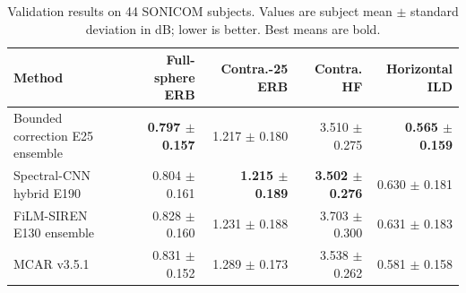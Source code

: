 \begin{table}[t]
\centering
\caption{Validation results on 44 SONICOM subjects. Values are subject mean $\pm$ standard deviation in dB; lower is better. Best means are bold.}
\label{tab:bounded-main-validation}
\begin{tabular}{lrrrr}
\toprule
Method & Full-sphere ERB & Contra.-25 ERB & Contra. HF & Horizontal ILD \\
\midrule
Bounded correction E25 ensemble & \textbf{0.797 $\pm$ 0.157} & 1.217 $\pm$ 0.180 & 3.510 $\pm$ 0.275 & \textbf{0.565 $\pm$ 0.159} \\
Spectral-CNN hybrid E190 & 0.804 $\pm$ 0.161 & \textbf{1.215 $\pm$ 0.189} & \textbf{3.502 $\pm$ 0.276} & 0.630 $\pm$ 0.181 \\
FiLM-SIREN E130 ensemble & 0.828 $\pm$ 0.160 & 1.231 $\pm$ 0.188 & 3.703 $\pm$ 0.300 & 0.631 $\pm$ 0.183 \\
MCAR v3.5.1 & 0.831 $\pm$ 0.152 & 1.289 $\pm$ 0.173 & 3.538 $\pm$ 0.262 & 0.581 $\pm$ 0.158 \\
\bottomrule
\end{tabular}
\end{table}
